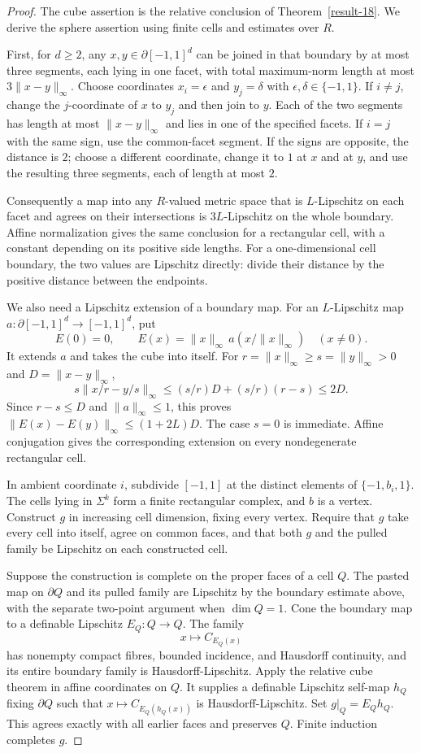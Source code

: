 \begin{proof}
The cube assertion is the relative conclusion of
Theorem~\ref{result-18}.  We derive the sphere assertion using
finite cells and estimates over $R$.

First, for $d\ge2$, any $x,y\in\partial[-1,1]^d$ can be joined
in that boundary by at most three segments, each lying in one
facet, with total maximum-norm length at most
$3\|x-y\|_\infty$.  Choose coordinates $x_i=\epsilon$ and
$y_j=\delta$ with $\epsilon,\delta\in\{-1,1\}$.
If $i\ne j$, change the $j$-coordinate of $x$ to $y_j$ and
then join to $y$.  Each of the two segments has length at most
$\|x-y\|_\infty$ and lies in one of the specified facets.
If $i=j$ with the same sign, use the common-facet segment.
If the signs are opposite, the distance is $2$; choose a
different coordinate, change it to $1$ at $x$ and at $y$,
and use the resulting three segments, each of length at most $2$.

Consequently a map into any $R$-valued metric space that is
$L$-Lipschitz on each facet and agrees on their intersections
is $3L$-Lipschitz on the whole boundary.  Affine normalization
gives the same conclusion for a rectangular cell, with a
constant depending on its positive side lengths.
For a one-dimensional cell boundary, the two values are
Lipschitz directly: divide their distance by the positive
distance between the endpoints.

We also need a Lipschitz extension of a boundary map.
For an $L$-Lipschitz map
$a:\partial[-1,1]^d\to[-1,1]^d$, put
\[
 E(0)=0,\qquad
 E(x)=\|x\|_\infty\,a(x/\|x\|_\infty)\quad(x\ne0).
\]
It extends $a$ and takes the cube into itself.
For $r=\|x\|_\infty\ge s=\|y\|_\infty>0$ and
$D=\|x-y\|_\infty$,
\[
 s\|x/r-y/s\|_\infty
 \le (s/r)D+(s/r)(r-s)\le2D.
\]
Since $r-s\le D$ and $\|a\|_\infty\le1$, this proves
$\|E(x)-E(y)\|_\infty\le(1+2L)D$.
The case $s=0$ is immediate.  Affine conjugation gives
the corresponding extension on every nondegenerate
rectangular cell.

In ambient coordinate $i$, subdivide $[-1,1]$ at the distinct
elements of $\{-1,b_i,1\}$.  The cells lying in $\Sigma^k$
form a finite rectangular complex, and $b$ is a vertex.
Construct $g$ in increasing cell dimension, fixing every
vertex.  Require that $g$ take every cell into itself, agree
on common faces, and that both $g$ and the pulled family be
Lipschitz on each constructed cell.

Suppose the construction is complete on the proper faces
of a cell $Q$.  The pasted map on $\partial Q$ and its
pulled family are Lipschitz by the boundary estimate above,
with the separate two-point argument when $\dim Q=1$.
Cone the boundary map to a definable Lipschitz
$E_Q:Q\to Q$.  The family
\[
 x\longmapsto C_{E_Q(x)}
\]
has nonempty compact fibres, bounded incidence, and
Hausdorff continuity, and its entire boundary family is
Hausdorff-Lipschitz.  Apply the relative cube theorem in
affine coordinates on $Q$.  It supplies a definable
Lipschitz self-map $h_Q$ fixing $\partial Q$ such that
$x\mapsto C_{E_Q(h_Q(x))}$ is Hausdorff-Lipschitz.
Set $g|_Q=E_Qh_Q$.  This agrees exactly with all earlier
faces and preserves $Q$.  Finite induction completes $g$.


\end{proof}
